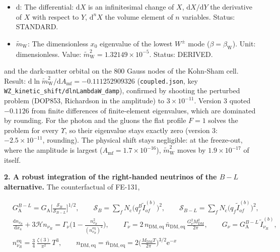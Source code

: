 \documentclass[
  10pt,
]{article}
\begin{document}
\begin{itemize}
  \(9H^2L^2/4\):
  \(\varkappa_{\mathrm{W}} = (9H^2L^2/4 - \tilde m_{\mathrm{W}}^2)^{1/2}\)
  (for such a profile the wave number \(\varpi\) of the oscillating
  profiles is imaginary, \(\varpi = \mathrm{i}\varkappa_{\mathrm{W}}\)).
  Unit: dimensionless. Value: 4.4999985 (\(HL = 3\)). Status: DERIVED.
\item
  \(\mathrm{d}\): The differential: \(\mathrm{d}X\) is an infinitesimal
  change of \(X\), \(\mathrm{d}X/\mathrm{d}Y\) the derivative of \(X\)
  with respect to \(Y\), \(\mathrm{d}^nX\) the volume element of \(n\)
  variables. Status: STANDARD.
\item
  \(\tilde m_{\mathrm{W}}\): The dimensionless \(x_0\) eigenvalue of the
  lowest \(W^\pm\) mode (\(\beta = \beta_{\mathrm{W}}\)). Unit:
  dimensionless. Value:
  \(\tilde m_{\mathrm{W}}^2 = 1.32149\times10^{-5}\). Status: DERIVED.
\end{itemize}

and the dark-matter orbital on the 800 Gauss nodes of the Kohn-Sham
cell. Result:
\(\mathrm{d}\ln\tilde m_{\mathrm{W}}^2/\mathrm{d}A_{\mathrm{mf}} = -0.111252909326\)
(\texttt{coupled.json}, key
\texttt{WZ\_kinetic\_shift/dlnLambdaW\_damp}), confirmed by shooting the
perturbed problem (DOP853, Richardson in the amplitude) to
\(3\times10^{-11}\). Version 3 quoted \(-0.1126\) from finite
differences of finite-element eigenvalues, which are dominated by
rounding. For the photon and the gluons the flat profile \(F = 1\)
solves the problem for every \(\Upsilon\), so their eigenvalue stays
exactly zero (version 3: \(-2.5\times10^{-11}\), rounding). The physical
shift stays negligible: at the freeze-out, where the amplitude is
largest (\(A_{\mathrm{mf}} = 1.7\times10^{-16}\)),
\(\tilde m_{\mathrm{W}}^2\) moves by \(1.9\times10^{-17}\) of itself.

\textbf{2. A robust integration of the right-handed neutrinos of the
\(B - L\) alternative.} The counterfactual of FE-131,

\[
\begin{aligned}
&G_{\mathrm{A}}^{B-L} = G_{\mathrm{A}}\Big[\frac{\mathcal{S}_B}{\mathcal{S}_{B-L}}\Big]^{1/2},\qquad
 \mathcal{S}_B = \sum_fN_{\mathrm{c}}\big(q^{B}_f\tilde I^{(b)}_{of}\big)^2,\qquad
 \mathcal{S}_{B-L} = \sum_fN_{\mathrm{c}}\big(q_f\tilde I^{(b)}_{of}\big)^2,\\
&\frac{\mathrm{d}n_{\nu_R}}{\mathrm{d}x_4} + 3\mathcal{H}n_{\nu_R} = \Gamma_\nu\Big(1 -
 \frac{n_{\nu_R}^2}{(n_{\nu_R}^{\mathrm{eq}})^2}\Big),\qquad
 \Gamma_\nu = 2\,n_{\mathrm{DM,eq}}\,\bar n_{\mathrm{DM,eq}}\,\frac{G_\nu^2M_{\mathrm{DM}}^2}{2\pi},\qquad
 G_\nu = G_{\mathrm{A}}^{B-L}\,\tilde I^{(b)}_{\nu_R},\\
&n_{\nu_R}^{\mathrm{eq}} = \frac34\,\frac{\zeta(3)}{\pi^2}\,T^3,\qquad
 n_{\mathrm{DM,eq}} = \bar n_{\mathrm{DM,eq}} = 2\Big(\frac{M_{\mathrm{DM}}T}{2\pi}\Big)^{3/2}\mathrm{e}^{-x}
\end{aligned} \tag{FE-131}
\]
\end{document}
